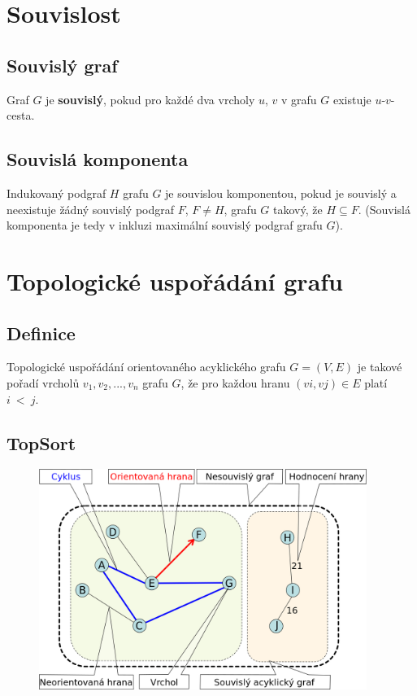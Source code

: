 \documentclass{szzclass}
\begin{document}
\section{Souvislost}
\subsection{Souvislý graf}
Graf $G$ je \textbf{souvislý}, pokud pro každé dva vrcholy $u$, $v$ v grafu $G$ existuje $u$-$v$-cesta.

\subsection{Souvislá komponenta}
Indukovaný podgraf $H$ grafu $G$ je souvislou komponentou, pokud je souvislý a neexistuje žádný souvislý podgraf $F$, $F \neq H$, grafu $G$ takový, že $H \subseteq F$.
(Souvislá komponenta je tedy v inkluzi maximální souvislý podgraf grafu $G$).

\section{Topologické uspořádání grafu}
\subsection{Definice}
Topologické uspořádání orientovaného acyklického grafu $G = (V, E)$ je takové pořadí vrcholů $v_1, v_2, . . . , v_n$ grafu $G$, že pro každou hranu $(vi, vj) \in E$ platí $i~<~j$.

\subsection{TopSort}
\begin{figure}[h!]
\includegraphics[width=0.95\textwidth]{topics/bi-spol-4/images/graf.png}   
\end{figure}
\end{document}
